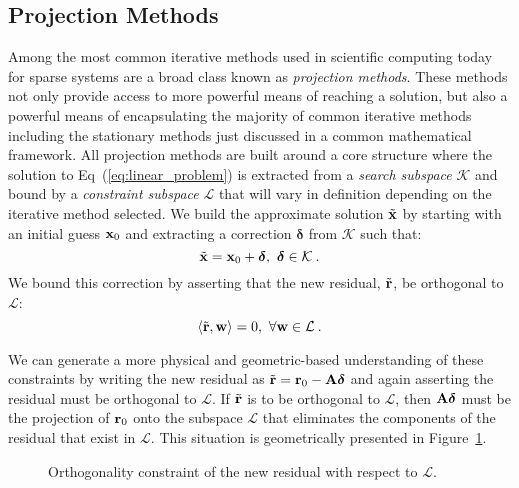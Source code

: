 \subsection{Projection Methods}
\label{subsec:projection_methods}
Among the most common iterative methods used in scientific computing
today for sparse systems are a broad class known as \textit{projection
  methods}. These methods not only provide access to more powerful
means of reaching a solution, but also a powerful means of
encapsulating the majority of common iterative methods including the
stationary methods just discussed in a common mathematical
framework. All projection methods are built around a core structure
where the solution to Eq~(\ref{eq:linear_problem}) is extracted from a
\textit{search subspace} $\mathcal{K}$ and bound by a
\textit{constraint subspace} $\mathcal{L}$ that will vary in
definition depending on the iterative method selected. We build the
approximate solution $\tilde{\mathbf{x}}$ by starting with an initial
guess $\mathbf{x}_0$ and extracting a correction $\boldsymbol{\delta}$
from $\mathcal{K}$ such that:
\begin{equation}
  \tilde{\mathbf{x}} = \mathbf{x}_0 +
  \boldsymbol{\delta},\ \boldsymbol{\delta} \in \mathcal{K}\:.
  \label{eq:linear_projection_step}
\end{equation}
We bound this correction by asserting that the new residual,
$\tilde{\mathbf{r}}$, be orthogonal to $\mathcal{L}$:
\begin{equation}
  \langle \tilde{\ve{r}},\ve{w} \rangle = 0,\ \forall \ve{w} \in
  \mathcal{L}\:.
  \label{eq:linear_projection_constraint}
\end{equation}

We can generate a more physical and geometric-based understanding of
these constraints by writing the new residual as $\tilde{\mathbf{r}} =
\mathbf{r}_0 - \mathbf{A}\boldsymbol{\delta}$ and again asserting the residual
must be orthogonal to $\mathcal{L}$. If $\tilde{\mathbf{r}}$ is to be
orthogonal to $\mathcal{L}$, then $\mathbf{A}\boldsymbol{\delta}$ must be
the projection of $\mathbf{r}_0$ onto the subspace $\mathcal{L}$ that
eliminates the components of the residual that exist in
$\mathcal{L}$. This situation is geometrically presented in
Figure~\ref{fig:linear_projection_constraint}.

\begin{figure}[htpb!]
  \begin{center}
    \scalebox{1.75}{
       }
  \end{center}
  \caption{Orthogonality constraint of the new residual with respect
    to $\mathcal{L}$.}
  \label{fig:linear_projection_constraint}
\end{figure}

